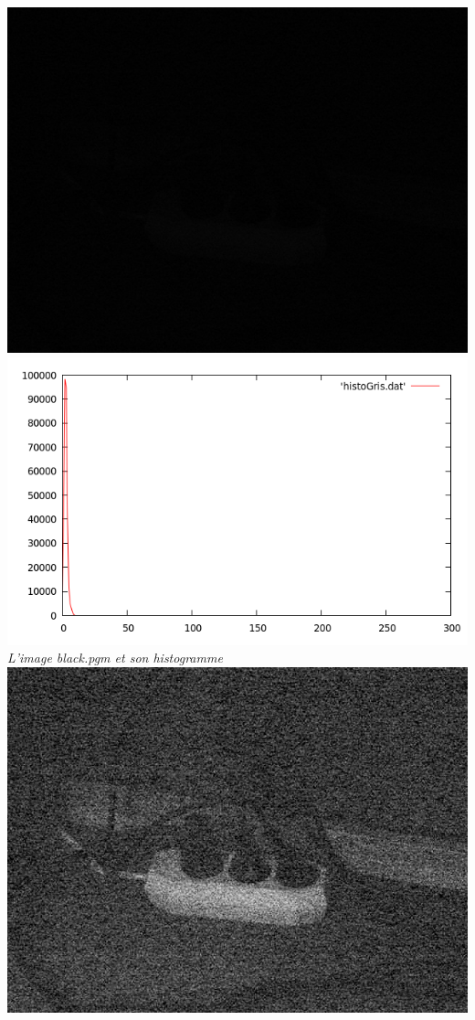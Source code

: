 \documentclass[a4paper,11pt]{article}
\begin{document}
\begin{center}
\includegraphics[scale=0.5]{blackgris.png}
\includegraphics[scale=0.5]{histoBlackGris.png}\\
\textit{L'image black.pgm et son histogramme}\\
\includegraphics[scale=0.5]{blackExpandgris.png}

\end{center}
\end{document}
